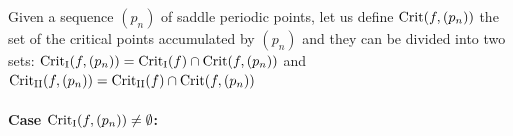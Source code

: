 \documentclass[a4paper,11pt]{article}
\theoremstyle{definition}
\def\La{\Lambda}
\def\La{\Lambda}
\def\emp{\emptyset}
\begin{document}
Given a sequence $(p_n)$ of saddle periodic points, let us define ${\rm Crit}(f, (p_n))$ the set of the critical points accumulated by $(p_n)$ and they can be divided into two sets: ${\rm Crit_I}(f, (p_n))= {\rm Crit_I}(f)\cap {\rm Crit}(f, (p_n))$ and ${\rm Crit_{II}}(f, (p_n))= {\rm Crit_{II}}(f)\cap {\rm Crit}(f, (p_n))$

\paragraph{Case ${\rm Crit_I}(f, (p_n))\neq \emptyset$: }







\end{document}
